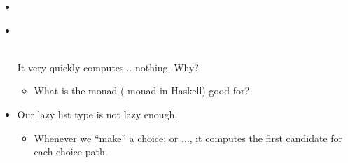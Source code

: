 \documentclass{beamer}
\newcommand{\tmverbatim}[1]{\text{{\ttfamily{#1}}}}
\begin{document}
\begin{itemize}
  {}{}{\hlopt{= }}{}{\hlopt{(}}{}{\hlendline{}}\\
  {\hlstd{ \ }}{}{}{}{\hlopt{= }}{}{}{\hlendline{}}\\
  {\hlstd{ \ }}{}{}{\hlopt{=}}{\hlendline{}}\\
  {\hlstd{ \ \ \ }}{}{}{}{}{\hlopt{-> }}{}{\hlopt{\textbar }}{}{}{\hlopt{-> }}{}{}{}{\hlopt{= }}{}{}{}{}{\hlopt{=
  }}{}{\hlendline{}}\\
  {\hlstd{ \ }}{}{}{\hlopt{= }}{}{}{}{}{\hlopt{-> }}{}{}{\hlstd{{\textunderscore} }}{\hlopt{->
  }}{}{\hlendline{}}\\
  {}{\hlopt{)}}{\hlendline{}}
  
  \item {}{}{\hlopt{= }}{}{\hlopt{(}}{}{\hlopt{)}}{\hlendline{}}\\
  {}{}{\hlopt{() =
  }}{}{}{}{\hlopt{(}}{}{}{}{\hlopt{[}}{}{\hlopt{;}}{}{\hlopt{;}}{}{\hlopt{;}}{}{\hlopt{;}}{}{\hlopt{;}}{}{\hlopt{]
  }}{}{\hlopt{)}}{\hlendline{}}
  
  \item {\hlstd{\# }}{}{}{\hlopt{, }}{}{\hlopt{= }}{}{\hlopt{;;}}{\hlendline{}}\\
  {}{}{\hlopt{: }}{}{\hlopt{=
  }}{}{\hlendline{}}\\
  {}{}{\hlopt{: }}{}{\hlopt{=
  }}{}{\hlendline{}}
  
  It very quickly computes... nothing. Why?
  \begin{itemize}
    \item What is the {} monad (\tmverbatim{Maybe} monad in
    Haskell) good for?
  \end{itemize}
  \item Our lazy list type is not lazy enough.
  \begin{itemize}
    \item Whenever we ``make'' a choice: \tmverbatim{a
    }{\hlopt{++}}\tmverbatim{ b} or \tmverbatim{msum\_map} ..., it computes
    the first candidate for each choice path.
    

\end{itemize}
\end{itemize}
\end{document}
